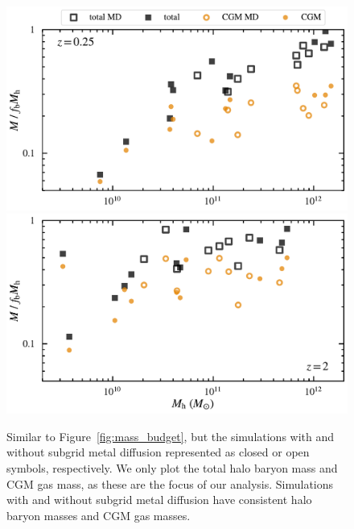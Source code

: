 \documentclass[fleqn,usenatbib]{mnras}
\begin{document}
\begin{figure}
\includegraphics[width=\columnwidth]{figures/mass_budget_snum465_md_comp.pdf}
\includegraphics[width=\columnwidth]{figures/mass_budget_snum172_md_comp.pdf}
\caption{
Similar to Figure~\ref{fig:mass_budget}, but the simulations with and without subgrid metal diffusion represented as closed or open symbols, respectively.
We only plot the total halo baryon mass and CGM gas mass, as these are the focus of our analysis.
Simulations with and without subgrid metal diffusion have consistent halo baryon masses and CGM gas masses.
}
\label{fig:mass_budget_md_comp}
\end{figure}
\end{document}
